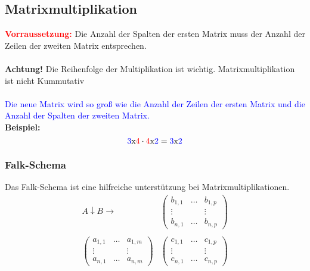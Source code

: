 \documentclass[12pt,a4paper]{article}
\begin{document}
\subsection{Matrixmultiplikation}
\textbf{\textcolor{red}{Vorraussetzung:}} Die Anzahl der Spalten der ersten Matrix muss der Anzahl der Zeilen der zweiten Matrix entsprechen. \\ \\
\textbf{Achtung!} Die Reihenfolge der Multiplikation ist wichtig. Matrixmultiplikation ist nicht Kummutativ\\ \\
\textcolor{blue}{Die neue Matrix wird so groß wie die Anzahl der Zeilen der ersten Matrix und die Anzahl der Spalten der zweiten Matrix.} \\
\textbf{Beispiel:}
\[
\textcolor{blue}{3}\text{x}\textcolor{red}{4} \cdot \textcolor{red}{4}\text{x}\textcolor{blue}{2} = \textcolor{blue}{3}\text{x}\textcolor{blue}{2}
\]
\subsubsection{Falk-Schema}
Das Falk-Schema ist eine hilfreiche unterstützung bei Matrixmultiplikationen. \\
\[
\begin{matrix}
A \downarrow B \rightarrow  & \begin{pmatrix}
       b_{1,1} & \dots & b_{1,p} \\
         \vdots &  & \vdots \\
         b_{n, 1} & \dots & b_{n, p}
        \end{pmatrix} \\ \\
\begin{pmatrix}
a_{1,1} & \dots & a_{1,m} \\
\vdots &  & \vdots \\
a_{n,1} & \dots & a_{n,m}
\end{pmatrix} & \begin{pmatrix}
c_{1,1} & \dots & c_{1,p} \\
\vdots &  & \vdots \\
c_{n,1} & \dots & c_{n,p}
\end{pmatrix}
\end{matrix}
\]
\end{document}
